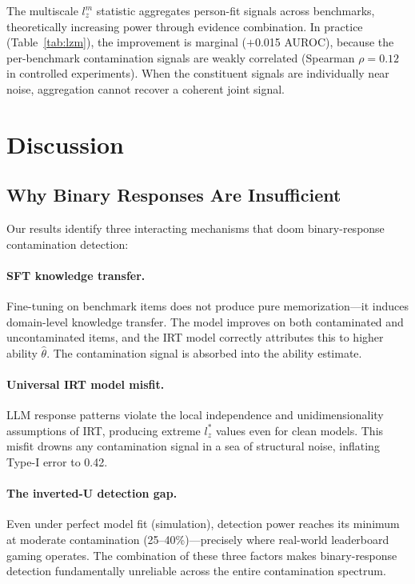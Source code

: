 \documentclass[11pt]{article}
\begin{document}
The multiscale $l_z^m$ statistic aggregates person-fit signals across benchmarks, theoretically increasing power through evidence combination.
In practice (Table~\ref{tab:lzm}), the improvement is marginal ($+$0.015 AUROC), because the per-benchmark contamination signals are weakly correlated (Spearman $\rho = 0.12$ in controlled experiments).
When the constituent signals are individually near noise, aggregation cannot recover a coherent joint signal.

\section{Discussion}

\subsection{Why Binary Responses Are Insufficient}

Our results identify three interacting mechanisms that doom binary-response contamination detection:

\paragraph{SFT knowledge transfer.}
Fine-tuning on benchmark items does not produce pure memorization---it induces domain-level knowledge transfer.
The model improves on both contaminated and uncontaminated items, and the IRT model correctly attributes this to higher ability $\hat{\theta}$.
The contamination signal is absorbed into the ability estimate.

\paragraph{Universal IRT model misfit.}
LLM response patterns violate the local independence and unidimensionality assumptions of IRT, producing extreme $l_z^*$ values even for clean models.
This misfit drowns any contamination signal in a sea of structural noise, inflating Type-I error to 0.42.

\paragraph{The inverted-U detection gap.}
Even under perfect model fit (simulation), detection power reaches its minimum at moderate contamination (25--40\%)---precisely where real-world leaderboard gaming operates.
The combination of these three factors makes binary-response detection fundamentally unreliable across the entire contamination spectrum.
\end{document}

